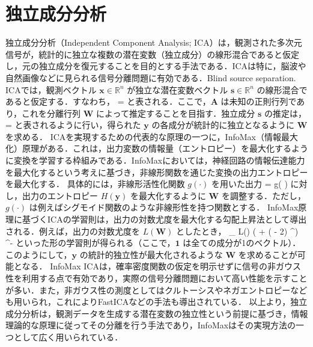 \section{独立成分分析}
独立成分分析（Independent Component Analysis; ICA）は，観測された多次元信号が，統計的に独立な複数の潜在変数（独立成分）の線形混合であると仮定し，元の独立成分を復元することを目的とする手法である．ICAは特に，脳波や自然画像などに見られる信号分離問題に有効である．Blind source separation.
ICAでは，観測ベクトル $\mathbf{x} \in \mathbb{R}^n$ が独立な潜在変数ベクトル $\mathbf{s} \in \mathbb{R}^n$ の線形混合であると仮定する．すなわち，
 =  
と表される．ここで，$\mathbf{A}$ は未知の正則行列であり，これを分離行列 $\mathbf{W}$ によって推定することを目指す．独立成分 $\mathbf{s}$ の推定は，
 =  
と表されるように行い，得られた $\mathbf{y}$ の各成分が統計的に独立となるように $\mathbf{W}$ を求める．
ICAを実現するための代表的な原理の一つに，InfoMax（情報最大化）原理がある．これは，出力変数の情報量（エントロピー）を最大化するように変換を学習する枠組みである．InfoMaxにおいては，神経回路の情報伝達能力を最大化するという考えに基づき，非線形関数を通じた変換の出力エントロピーを最大化する．
具体的には，非線形活性化関数 $g(\cdot)$ を用いた出力
 = g( )
に対し，出力のエントロピー $H(\mathbf{y})$ を最大化するように $\mathbf{W}$ を調整する．ただし，$g(\cdot)$ は例えばシグモイド関数のような非線形性を持つ関数とする．
InfoMax原理に基づくICAの学習則は，出力の対数尤度を最大化する勾配上昇法として導出される．例えば，出力の対数尤度を $L(\mathbf{W})$ としたとき，
\nabla_{} L() \propto \left(  + ( - 2) ^\top \right) ^{-\top}
といった形の学習則が得られる（ここで，$\mathbf{1}$ は全ての成分が1のベクトル）．このようにして，$\mathbf{y}$ の統計的独立性が最大化されるような $\mathbf{W}$ を求めることが可能となる．
InfoMax ICAは，確率密度関数の仮定を明示せずに信号の非ガウス性を利用する点で有効であり，実際の信号分離問題において高い性能を示すことが多い．また，非ガウス性の測度としてはクルトーシスやネガエントロピーなども用いられ，これによりFastICAなどの手法も導出されている．
以上より，独立成分分析は，観測データを生成する潜在変数の独立性という前提に基づき，情報理論的な原理に従ってその分離を行う手法であり，InfoMaxはその実現方法の一つとして広く用いられている．
